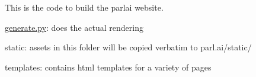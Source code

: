 This is the code to build the parlai website.


\begin{DoxyItemize}
\item {\ttfamily \hyperlink{generate_8py}{generate.\+py}}\+: does the actual rendering
\item {\ttfamily static}\+: assets in this folder will be copied verbatim to parl.\+ai/static/
\item {\ttfamily templates}\+: contains html templates for a variety of pages 
\end{DoxyItemize}